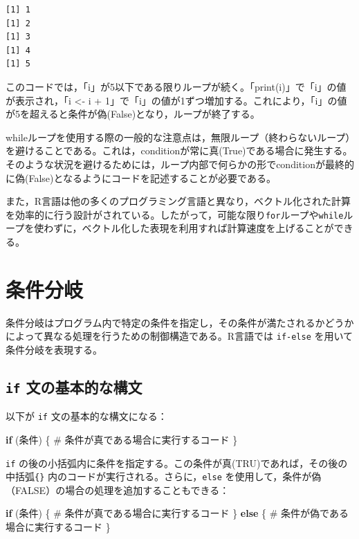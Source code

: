 \documentclass[
  a4paper,
]{ltjsbook}
\newenvironment{Shaded}{\begin{snugshade}}{\end{snugshade}}
\newcommand{\CommentTok}[1]{\textcolor[rgb]{0.37,0.37,0.37}{#1}}
\newcommand{\ControlFlowTok}[1]{\textcolor[rgb]{0.00,0.23,0.31}{\textbf{#1}}}
\newcommand{\NormalTok}[1]{\textcolor[rgb]{0.00,0.23,0.31}{#1}}
\begin{document}
\begin{verbatim}
[1] 1
[1] 2
[1] 3
[1] 4
[1] 5
\end{verbatim}

このコードでは，「i」が5以下である限りループが続く。「print(i)」で「i」の値が表示され，「i
\textless- i +
1」で「i」の値が1ずつ増加する。これにより，「i」の値が5を超えると条件が偽(False)となり，ループが終了する。

whileループを使用する際の一般的な注意点は，無限ループ（終わらないループ）を避けることである。これは，conditionが常に真(True)である場合に発生する。そのような状況を避けるためには，ループ内部で何らかの形でconditionが最終的に偽(False)となるようにコードを記述することが必要である。

また，R言語は他の多くのプログラミング言語と異なり，ベクトル化された計算を効率的に行う設計がされている。したがって，可能な限り\texttt{for}ループや\texttt{while}ループを使わずに，ベクトル化した表現を利用すれば計算速度を上げることができる。

\section{条件分岐}\label{ux6761ux4ef6ux5206ux5c90}

条件分岐はプログラム内で特定の条件を指定し，その条件が満たされるかどうかによって異なる処理を行うための制御構造である。R言語では
\texttt{if-else} を用いて条件分岐を表現する。

\subsection{\texorpdfstring{\texttt{if}
文の基本的な構文}{if 文の基本的な構文}}\label{if-ux6587ux306eux57faux672cux7684ux306aux69cbux6587}

以下が \texttt{if} 文の基本的な構文になる：

\begin{Shaded}
\begin{Highlighting}[]
\ControlFlowTok{if}\NormalTok{ (条件) \{}
    \CommentTok{\# 条件が真である場合に実行するコード}
\NormalTok{\}}
\end{Highlighting}
\end{Shaded}

\texttt{if}
の後の小括弧内に条件を指定する。この条件が真(TRU)であれば，その後の
中括弧\texttt{\{\}} 内のコードが実行される。さらに，\texttt{else}
を使用して，条件が偽（FALSE）の場合の処理を追加することもできる：

\begin{Shaded}
\begin{Highlighting}[]
\ControlFlowTok{if}\NormalTok{ (条件) \{}
    \CommentTok{\# 条件が真である場合に実行するコード}
\NormalTok{\} }\ControlFlowTok{else}\NormalTok{ \{}
    \CommentTok{\# 条件が偽である場合に実行するコード}
\NormalTok{\}}
\end{Highlighting}
\end{Shaded}
\end{document}
